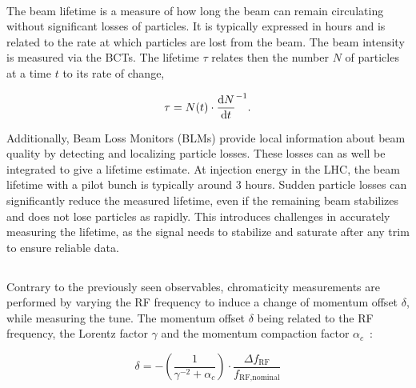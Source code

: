 \paragraph{}

The beam lifetime is a measure of how long the beam can remain circulating without significant
losses of particles. It is typically expressed in hours and is related to the rate
at which particles are lost from the beam. The beam intensity is measured via the BCTs. The lifetime
$\tau$ relates then the number $N$ of particles at a time $t$ to its rate of change,

\begin{equation}
    \tau = N(t) \cdot \frac{\mathop{}\!\mathrm{d} N}{\mathop{}\!\mathrm{d} t}^{-1}.
\end{equation}

Additionally, Beam Loss Monitors (BLMs) provide local information about beam quality by detecting
and localizing particle losses. These losses can as well be integrated to give a lifetime estimate.
At injection energy in the LHC, the beam lifetime with a pilot bunch is typically around 3 hours.
Sudden particle losses can significantly reduce the measured lifetime, even if the remaining beam
stabilizes and does not lose particles as rapidly. This introduces challenges in accurately
measuring the lifetime, as the signal needs to stabilize and saturate after any trim to ensure
reliable data.


\subsection{}
\label{subsection:optics_corrections_chromaticity}


Contrary to the previously seen observables, chromaticity measurements are performed by varying
the RF frequency to induce a change of momentum offset $\delta$, while measuring the tune. The
momentum offset $\delta$ being related to the RF frequency, the Lorentz factor $\gamma$ and the
momentum compaction factor $\alpha_c$~\cite{keintzel_jacqueline_beam_nodate}:

\begin{equation}
    \delta = - \left(\frac{1}{\gamma^{-2} + \alpha_c}\right) \cdot \frac{\Delta f_{\text{RF}}}{f_{\text{RF,nominal}}}
    \label{eq:dpp_rf}
\end{equation}

